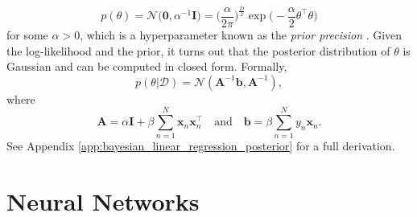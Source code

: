 \documentclass[msc,deptreport.inf]{infthesis} %
\newcommand{\matr}[1]{\mathbf{#1}}
\begin{document}
\begin{equation}\label{eqn:linear_regression_prior}
	p(\theta) 
	= \mathcal{N}\big(\matr{0}, \alpha^{-1} \matr{I} \big)
	= \Big(\frac{\alpha}{2\pi}\Big)^{\frac{D}{2}} \exp\Big(-\frac{\alpha}{2} \theta^\intercal \theta \Big)
\end{equation}
for some $\alpha > 0$, which is a hyperparameter known as the \emph{prior precision} \cite{barber2007}. Given the log-likelihood and the prior, it turns out that the posterior distribution of $\theta$ is Gaussian and can be computed in closed form. Formally, 
\begin{equation}\label{eqn:linear_regression_posterior}
	p(\theta | \mathcal{D}) = \mathcal{N}(\matr{A}^{-1} \matr{b}, \matr{A}^{-1}),
\end{equation}
where
\begin{equation}\label{eqn:linear_model_A_and_b}
	\matr{A} = \alpha \matr{I} + \beta \sum_{n=1}^N \matr{x}_n \matr{x}_n^\intercal
	\quad \text{and} \quad 
	\matr{b} = \beta \sum_{n=1}^N y_n \matr{x}_n.
\end{equation}
See Appendix \ref{app:bayesian_linear_regression_posterior} for a full derivation.


\section{Neural Networks}
\end{document}
